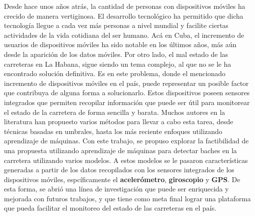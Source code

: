 \begin{resumen}
	Desde hace unos años atrás, la cantidad de personas con dispositivos móviles ha crecido de manera vertiginosa. El desarrollo
	tecnológico ha permitido que dicha tecnología llegue a cada vez más personas a nivel mundial y facilite ciertas actividades 
	de la vida cotidiana del ser humano. Acá en Cuba, el incremento de usuarios de dispositivos móviles ha sido notable en los últimos
	años, más aún desde la aparición de los datos móviles. Por otro lado, el mal estado de las carreteras en La Habana, sigue siendo un 
	tema complejo, al que no se le ha encontrado solución definitiva. Es en este problema, donde el mencionado incremento de dispositivos
	móviles en el país, puede representar un posible factor que contribuya de alguna forma a solucionarlo. Estos dispositivos poseen 
	sensores integrados que permiten recopilar información que puede ser útil para monitorear el estado de la carretera de forma sencilla y 
	barata. Muchos autores en la literatura han propuesto varios métodos para llevar a cabo esta tarea, desde técnicas basadas en umbrales, 
	hasta los más reciente enfoques utilizando aprendizaje de máquinas. Con este trabajo, se propuso explorar la factibilidad
	de una propuesta utilizando aprendizaje de máquinas para detectar baches en la carretera utilizando varios modelos. A estos modelos se le 
	pasaron características generadas a partir de los datos recopilados con los sensores integrados de los dispositivos móviles, espcíficamente el
	\textbf{acelerómetro}, \textbf{giroscopio} y \textbf{GPS}. De esta forma, se abrió una línea de investigación que puede ser enriquecida
	y mejorada con futuros trabajos, y que tiene como meta final lograr una plataforma que pueda facilitar el monitoreo del estado de las
	carreteras en el país.
\end{resumen}

